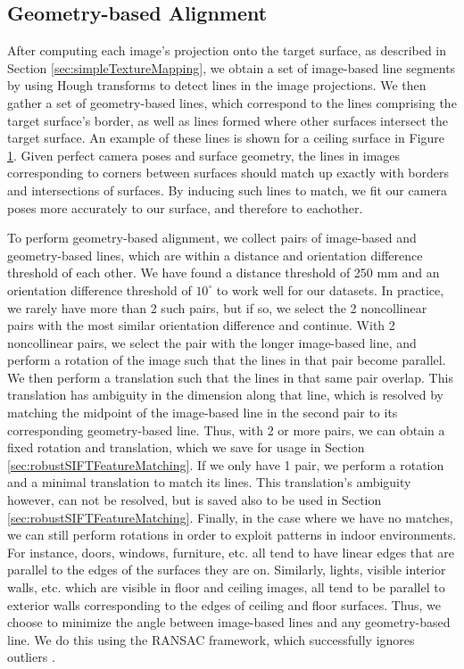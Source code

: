 \documentclass[]{spie}  %
\begin{document}
\subsection{Geometry-based Alignment}
\label{sec:geometryAlignment}


\begin{figure}
  \centering
  \caption{}
  \label{fig:geometryAlignment}
\end{figure}


After computing each image's projection onto the target surface, as
described in Section \ref{sec:simpleTextureMapping}, we obtain a set
of image-based line segments by using Hough transforms to detect lines
in the image projections. We then gather a set of geometry-based
lines, which correspond to the lines comprising the target surface's
border, as well as lines formed where other surfaces intersect the
target surface. An example of these lines is shown for a ceiling
surface in Figure \ref{fig:geometryAlignment}. Given perfect camera
poses and surface geometry, the lines in images corresponding to
corners between surfaces should match up exactly with borders and
intersections of surfaces. By inducing such lines to match, we fit our
camera poses more accurately to our surface, and therefore to
eachother.

To perform geometry-based alignment, we collect pairs of image-based
and geometry-based lines, which are within a distance and orientation
difference threshold of each other. We have found a distance threshold
of 250 mm and an orientation difference threshold of $10^\circ$ to
work well for our datasets. In practice, we rarely have more than 2
such pairs, but if so, we select the 2 noncollinear pairs with the
most similar orientation difference and continue. With 2 noncollinear
pairs, we select the pair with the longer image-based line, and
perform a rotation of the image such that the lines in that pair
become parallel. We then perform a translation such that the lines in
that same pair overlap. This translation has ambiguity in the
dimension along that line, which is resolved by matching the midpoint
of the image-based line in the second pair to its corresponding
geometry-based line. Thus, with 2 or more pairs, we can obtain a fixed
rotation and translation, which we save for usage in Section
\ref{sec:robustSIFTFeatureMatching}. If we only have 1 pair, we
perform a rotation and a minimal translation to match its lines. This
translation's ambiguity however, can not be resolved, but is saved
also to be used in Section
\ref{sec:robustSIFTFeatureMatching}. Finally, in the case where we
have no matches, we can still perform rotations in order to exploit
patterns in indoor environments. For instance, doors, windows,
furniture, etc. all tend to have linear edges that are parallel to the
edges of the surfaces they are on. Similarly, lights, visible interior
walls, etc. which are visible in floor and ceiling images, all tend to
be parallel to exterior walls corresponding to the edges of ceiling
and floor surfaces. Thus, we choose to minimize the angle between
image-based lines and any geometry-based line. We do this using the
RANSAC framework, which successfully ignores outliers
\cite{fischler1981random}. 
\end{document}
